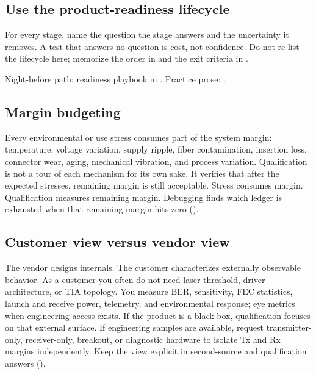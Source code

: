 

\subsection{Use the product-readiness lifecycle}
\label{sec:interview-validation-ladder}


For every stage, name the question the stage answers and the uncertainty it
removes. A test that answers no question is cost, not confidence. Do not re-list
the lifecycle here; memorize the order in  and the exit criteria
in .

Night-before path: readiness playbook in .
Practice prose: .

\subsection{Margin budgeting}
\label{sec:interview-margin-budget}

Every environmental or use stress consumes part of the system margin:
temperature, voltage variation, supply ripple, fiber contamination, insertion
loss, connector wear, aging, mechanical vibration, and process variation.
Qualification is not a tour of each mechanism for its own sake. It verifies
that after the expected stresses, remaining margin is still acceptable.
Stress consumes margin. Qualification measures remaining margin. Debugging
finds which ledger is exhausted when that remaining margin hits zero
().

\subsection{Customer view versus vendor view}
\label{sec:interview-customer-vendor}

The vendor designs internals. The customer characterizes externally
observable behavior. As a customer you often do not need laser threshold,
driver architecture, or TIA topology. You measure BER, sensitivity, FEC
statistics, launch and receive power, telemetry, and environmental response;
eye metrics when engineering access exists. If the product is a black box,
qualification focuses on that external surface. If engineering samples are
available, request transmitter-only, receiver-only, breakout, or diagnostic
hardware to isolate Tx and Rx margins independently. Keep the view explicit
in second-source and qualification answers
().

